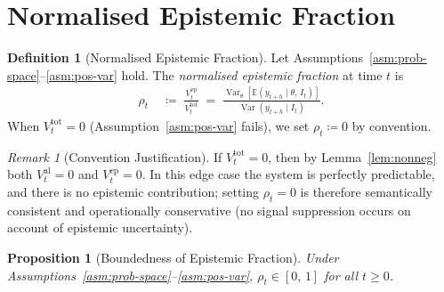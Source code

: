 \documentclass[12pt,openany]{book}
\newcommand{\calI}{\mathcal{I}}
\newcommand{\E}{\mathbb{E}}
\numberwithin{equation}{chapter}
\theoremstyle{plain}
\newtheorem{proposition}[theorem]{Proposition}
\theoremstyle{definition}
\newtheorem{definition}[theorem]{Definition}
\theoremstyle{remark}
\newtheorem{remark}[theorem]{Remark}
\numberwithin{equation}{chapter}
\theoremstyle{plain}
\DeclareMathOperator{\Var}{Var}
\def\calI{I}%
\begin{document}
\section{Normalised Epistemic Fraction}

\begin{definition}[Normalised Epistemic Fraction]
\label{def:epistemic-fraction}
Let Assumptions~\ref{asm:prob-space}--\ref{asm:pos-var} hold.
The \emph{normalised epistemic fraction} at time $t$ is
\begin{align}
  \rho_t
  &\;\coloneqq\;
  \frac{V^{\mathrm{ep}}_t}{V^{\mathrm{tot}}_t}
  \;=\;
  \frac{
    \Var_\theta\!\left[\E(y_{t+h} \mid \theta,\, \calI_t)\right]
  }{
    \Var(y_{t+h} \mid \calI_t)
  }.
  \label{eq:epistemic-frac}
\end{align}
When $V^{\mathrm{tot}}_t = 0$ (Assumption~\ref{asm:pos-var} fails),
we set $\rho_t \coloneqq 0$ by convention.
\end{definition}

\begin{remark}[Convention Justification]
\label{rem:zero-convention}
If $V^{\mathrm{tot}}_t = 0$, then by Lemma~\ref{lem:nonneg}
both $V^{\mathrm{al}}_t = 0$ and $V^{\mathrm{ep}}_t = 0$.  In
this edge case the system is perfectly predictable, and there is
no epistemic contribution; setting $\rho_t = 0$ is therefore
semantically consistent and operationally conservative (no
signal suppression occurs on account of epistemic uncertainty).
\end{remark}

\begin{proposition}[Boundedness of Epistemic Fraction]
\label{prop:epistemic-bounded}
Under Assumptions~\ref{asm:prob-space}--\ref{asm:pos-var},
$\rho_t \in [0,\, 1]$ for all $t \geq 0$.
\end{proposition}
\end{document}
